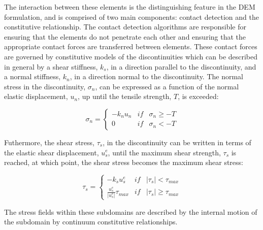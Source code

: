 
The interaction between these elements is the distinguishing feature in the DEM formulation, and is comprised of two main components: contact detection and the constitutive relationship. The contact detection algorithms are responsible for ensuring that the elements do not penetrate each other and ensuring that the appropriate contact forces are transferred between elements. These contact forces are governed by constitutive models of the discontinuities which can be described in general by a shear stiffness, $k_s$, in a direction parallel to the discontinuity, and a normal stiffness, $k_n$, in a direction normal to the discontinuity. The normal stress in the discontinuity, $\sigma_n$, can be expressed as a function of the normal elastic displacement, $u_n$, up until the tensile strength, $T$, is exceeded: 

\begin{equation}
\sigma_n=\left\{\begin{matrix}
-k_n u_n &if&\sigma_n \geq -T\\ 
 0 & if &\sigma_n < -T
\end{matrix}\right.
\label{eqn:demnormal}
\end{equation}

Futhermore, the shear stress, $\tau_s$, in the discontinuity can be written in terms of the elastic shear displacement, $u_s^e$, until the maximum shear strength, $\tau_s$ is reached, at which point, the shear stress becomes the maximum shear stress:

\begin{equation}
\tau_s=\left\{\begin{matrix}
-k_s u_s^e &if&\left |\tau_{s} \right | < \tau_{max}\\ 
\frac{u_s^e}{\left|u_s^e\right|}\tau_{max} & if &\left |\tau_{s} \right | \geq \tau_{max}
\end{matrix}\right.
\label{eqn:demshear}
\end{equation}

The stress fields within these subdomains are described by the internal motion of the subdomain by continuum constitutive relationships.  